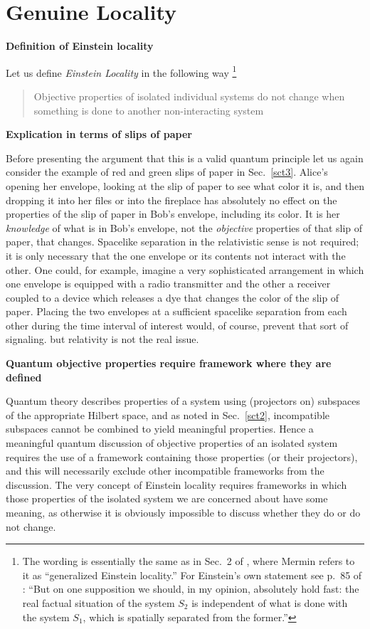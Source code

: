 \documentclass[12pt]{article} %
\def\outl#1{\par{\medskip\noindent\hspace*{.5cm}\bf
      \mathversion{bold}#1\mathversion{normal}\smallskip} }
\def\np{} \def\xa{} \def\xb{} \def\xn{} \def\xp{}
\def\outl#1{} \def\np{} \def\xa{} \def\xb{} \def\xn{} \def\xp{}
\def\outl#1{\par{\medskip\noindent\hspace*{.5cm}\bf
      \mathversion{bold}#1\mathversion{normal}\smallskip} }
\def\np{\newpage }\def\xn{\nopagebreak }\def\xp{\pagebreak }
\begin{document}
\xb
\section{Genuine Locality}
\label{sct6}
\xa

\xb
\outl{Definition of Einstein locality}
\xa


Let us define \emph{Einstein Locality} in the following way%
\footnote{The wording is essentially the same as in Sec.~2 of \cite{Mrmn98},
  where Mermin refers to it as ``generalized Einstein locality.''  For
  Einstein's own statement see p.~85 of \cite{Enst51}: ``But on one
  supposition we should, in my opinion, absolutely hold fast: the real factual
  situation of the system $S_2$ is independent of what is done with the system
  $S_1$, which is spatially separated from the former.''} %


\begin{quote}

Objective properties of isolated individual systems do not change when 
something is done to another non-interacting system
\end{quote}

\xb
\outl{Explication in terms of slips of paper}
\xa


Before presenting the argument that this is a valid quantum principle let us
again  consider the example of red and green slips of paper
in Sec.~\ref{sct3}.  Alice's opening her envelope, looking at the slip of
paper to see what color it is, and then dropping it into her files or into the
fireplace has absolutely no effect on the properties of the slip of paper in
Bob's envelope, including its color.  It is her \emph{knowledge} of what is in
Bob's envelope, not the \emph{objective} properties of that slip of paper, that
changes.  Spacelike separation in the relativistic sense is not required; it
is only necessary that the one envelope or its contents not interact with the
other.  One could, for example, imagine a very sophisticated arrangement in
which one envelope is equipped with a radio transmitter and the other a
receiver coupled to a device which releases a dye that changes the color of
the slip of paper.  Placing the two envelopes at a sufficient spacelike
separation from each other during the time interval of interest would, of
course, prevent that sort of signaling. but relativity is not the real issue.

\xb
\outl{Quantum objective properties require framework where they are defined}
\xa


Quantum theory describes properties of a system using (projectors on)
subspaces of the appropriate Hilbert space, and as noted in Sec.~\ref{sct2},
incompatible subspaces cannot be combined to yield meaningful
properties. Hence a meaningful quantum discussion of objective properties of
an isolated system requires the use of a framework containing those
properties (or their projectors), and this will necessarily exclude other
incompatible frameworks from the discussion. The very concept of Einstein
locality requires frameworks in which those properties of the isolated system
we are concerned about have some meaning, as otherwise it is obviously
impossible to discuss whether they do or do not change.
\end{document}

